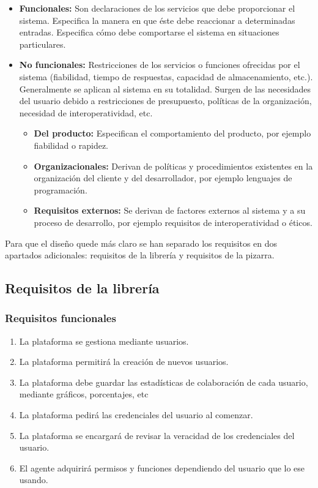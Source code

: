 \begin{itemize}
	\item \textbf{Funcionales: }Son declaraciones de los servicios que debe proporcionar el sistema. Especifica la manera en que éste debe reaccionar a determinadas entradas. Especifica cómo debe comportarse el sistema en situaciones particulares.
	\item \textbf{No funcionales: } Restricciones de los servicios o funciones ofrecidas por el sistema (fiabilidad, tiempo de respuestas, capacidad de almacenamiento, etc.). Generalmente se aplican al sistema en su totalidad. Surgen de las necesidades del usuario debido a restricciones de presupuesto, políticas de la organización, necesidad de interoperatividad, etc.
	\begin{itemize}
		\item\textbf{Del producto:} Especifican el comportamiento del producto, por ejemplo fiabilidad o rapidez.
		\item\textbf{Organizacionales:} Derivan de políticas y procedimientos existentes en la organización del cliente y del desarrollador, por ejemplo lenguajes de programación.
		\item\textbf{Requisitos externos:} Se derivan de factores externos al sistema y a su proceso de desarrollo, por ejemplo requisitos de interoperatividad o éticos.
	\end{itemize}
\end{itemize}

Para que el diseño quede más claro se han separado los requisitos en dos apartados adicionales: requisitos de la librería y requisitos de la pizarra. 

\subsection{Requisitos de la librería}
\subsubsection{Requisitos funcionales}
	\begin{enumerate}
		\item La plataforma se gestiona mediante usuarios.
		\item La plataforma permitirá la creación de nuevos usuarios.
		\item La plataforma debe guardar las estadísticas de colaboración de cada usuario, mediante gráficos, porcentajes, etc
		\item La plataforma pedirá las credenciales del usuario al comenzar.
		\item La plataforma se encargará de revisar la veracidad de los credenciales del usuario.
		\item El agente adquirirá permisos y funciones dependiendo del usuario que lo ese usando.
	\end{enumerate}
